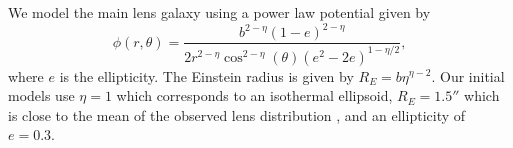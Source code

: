 We model the main lens galaxy using a power law potential given by
\begin{equation}
\phi(r, \theta) = \frac{b^{2 - \eta} (1 - e)^ {2 - \eta}}{2 r^{2 - \eta} \cos^{2 - \eta}(\theta) (e^2 - 2 e )^{1 - \eta / 2}},
\end{equation}
where $e$ is the ellipticity. The Einstein radius is given by $R_E = b \eta^{\eta - 2}$. Our initial models use $\eta = 1$ which corresponds to an isothermal ellipsoid, $R_E = 1.5''$ which is close to the mean of the observed lens distribution \citep{Sonnefeld13}, and an ellipticity of $e = 0.3$.